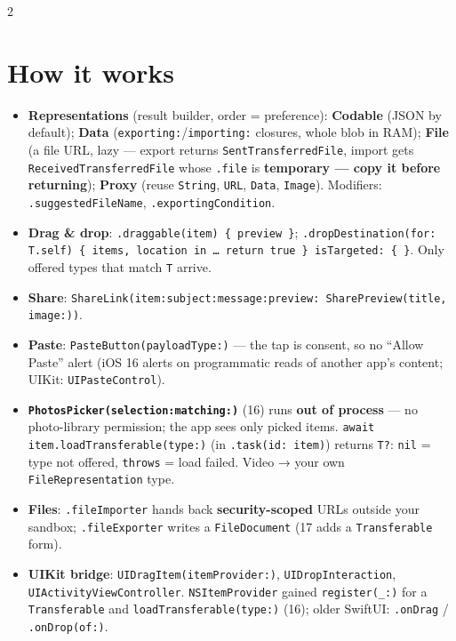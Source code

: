 \documentclass[8pt]{extarticle}
\begin{document}
\begin{multicols}{2}
\raggedright

\section{How it works}
\begin{itemize}
  \item \textbf{Representations} (result builder, order = preference): \textbf{Codable} (JSON by default);
        \textbf{Data} (\texttt{exporting:}/\texttt{importing:} closures, whole blob in RAM); \textbf{File} (a file URL,
        lazy — export returns \texttt{SentTransferredFile}, import gets \texttt{ReceivedTransferredFile} whose
        \texttt{.file} is \textbf{temporary — copy it before returning}); \textbf{Proxy} (reuse \texttt{String},
        \texttt{URL}, \texttt{Data}, \texttt{Image}). Modifiers: \texttt{.suggestedFileName}, \texttt{.exportingCondition}.
  \item \textbf{Drag \& drop}: \texttt{.draggable(item) \{ preview \}}; \texttt{.dropDestination(for: T.self)
        \{ items, location in … return true \} isTargeted: \{ \}}. Only offered types that match \texttt{T} arrive.
  \item \textbf{Share}: \texttt{ShareLink(item:subject:message:preview: SharePreview(title, image:))}.
  \item \textbf{Paste}: \texttt{PasteButton(payloadType:)} — the tap is consent, so no ``Allow Paste'' alert (iOS 16
        alerts on programmatic reads of another app's content; UIKit: \texttt{UIPasteControl}).
  \item \textbf{\texttt{PhotosPicker(selection:matching:)}} (16) runs \textbf{out of process} — no photo-library permission;
        the app sees only picked items. \texttt{await item.loadTransferable(type:)} (in \texttt{.task(id: item)})
        returns \texttt{T?}: \texttt{nil} = type not offered, \texttt{throws} = load failed. Video → your own
        \texttt{FileRepresentation} type.
  \item \textbf{Files}: \texttt{.fileImporter} hands back \textbf{security-scoped} URLs outside your sandbox;
        \texttt{.fileExporter} writes a \texttt{FileDocument} (17 adds a \texttt{Transferable} form).
  \item \textbf{UIKit bridge}: \texttt{UIDragItem(itemProvider:)}, \texttt{UIDropInteraction},
        \texttt{UIActivityViewController}. \texttt{NSItemProvider} gained \texttt{register(\_:)} for a
        \texttt{Transferable} and \texttt{loadTransferable(type:)} (16); older SwiftUI: \texttt{.onDrag} / \texttt{.onDrop(of:)}.
\end{itemize}


\end{multicols}
\end{document}
